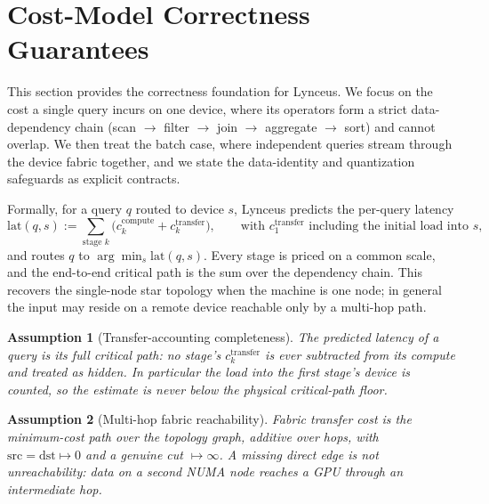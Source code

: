 \documentclass{article}
\newtheorem{assumption}{Assumption}
\begin{document}
\section{Cost-Model Correctness Guarantees}
\label{sec:guarantees}

This section provides the correctness foundation for Lynceus. We focus on the
cost a single query incurs on one device, where its operators form a strict
data-dependency chain (scan $\to$ filter $\to$ join $\to$ aggregate $\to$ sort)
and cannot overlap. We then treat the batch case, where independent queries
stream through the device fabric together, and we state the data-identity and
quantization safeguards as explicit contracts.

Formally, for a query $q$ routed to device $s$, Lynceus predicts the per-query
latency
\begin{equation}
\label{eq:critpath}
\mathrm{lat}(q,s) := \sum_{\text{stage } k} \big( c^{\mathrm{compute}}_k +
c^{\mathrm{transfer}}_k \big), \qquad \text{with } c^{\mathrm{transfer}}_1
\text{ including the initial load into } s,
\end{equation}
and routes $q$ to $\arg\min_s \mathrm{lat}(q,s)$. Every stage is priced on a
common scale, and the end-to-end critical path is the sum over the dependency
chain. This recovers the single-node star topology when the machine is one node;
in general the input may reside on a remote device reachable only by a multi-hop
path.

\begin{assumption}[Transfer-accounting completeness]
\label{asm:transfer}
The predicted latency of a query is its full critical path: no stage's
$c^{\mathrm{transfer}}_k$ is ever subtracted from its compute and treated as
hidden. In particular the load into the first stage's device is counted, so the
estimate is never below the physical critical-path floor.
\end{assumption}

\begin{assumption}[Multi-hop fabric reachability]
\label{asm:fabric}
Fabric transfer cost is the minimum-cost path over the topology graph, additive
over hops, with $\mathrm{src}=\mathrm{dst}\mapsto 0$ and a genuine cut
$\mapsto\infty$. A missing direct edge is not unreachability: data on a second
NUMA node reaches a GPU through an intermediate hop.
\end{assumption}
\end{document}

